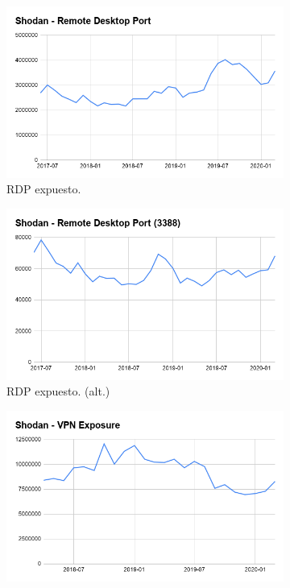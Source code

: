 \begin{figure}[h]
     \centering
     \begin{subfigure}[b]{0.3\textwidth}
         \centering
         \includegraphics[width=\textwidth]{img/tables/01_Shodan-RDP.png}
         \caption{RDP expuesto.}
         \label{fig:puerto 3389 expuesto}
     \end{subfigure}
     \begin{subfigure}[b]{0.3\textwidth}
         \centering
         \includegraphics[width=\textwidth]{img/tables/02_Shodan-RDP-alt.png}
         \caption{RDP expuesto. (alt.)}
         \label{fig:puerto 3388 expuesto}
     \end{subfigure}
     \begin{subfigure}[b]{0.3\textwidth}
        \centering
        \includegraphics[width=\textwidth]{img/tables/03_Shodan-VPN.png}

\end{subfigure}
\end{figure}
